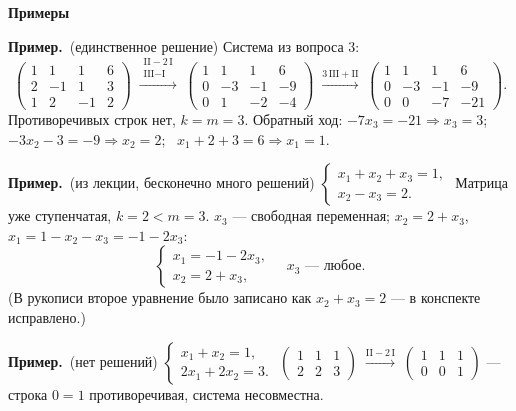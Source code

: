 \documentclass[a4paper,11pt]{article}
\newcommand{\gauss}[1]{\;\xrightarrow{\scriptstyle #1}\;}
\newcommand{\prim}{\par\smallskip\noindent\textbf{\textcolor{teoc!80!black}{Пример.}}\ }
\newcommand{\podr}[1]{\par\needspace{8\baselineskip}\medskip
  {\large\bfseries\textcolor{oprc!80!black}{#1}}\par\nopagebreak\smallskip}
\begin{document}
\podr{Примеры}

\prim (единственное решение) Система из вопроса 3:
\[
  \left(\begin{array}{rrr|r} 1 & 1 & 1 & 6 \\ 2 & -1 & 1 & 3 \\ 1 & 2 & -1 & 2 \end{array}\right)
  \gauss{\substack{\text{II} - 2\,\text{I} \\ \text{III} - \text{I}}}
  \left(\begin{array}{rrr|r} 1 & 1 & 1 & 6 \\ 0 & -3 & -1 & -9 \\ 0 & 1 & -2 & -4 \end{array}\right)
  \gauss{3\,\text{III} + \text{II}}
  \left(\begin{array}{rrr|r} 1 & 1 & 1 & 6 \\ 0 & -3 & -1 & -9 \\ 0 & 0 & -7 & -21 \end{array}\right).
\]
Противоречивых строк нет, $k = m = 3$. Обратный ход:
$-7x_3 = -21 \Rightarrow x_3 = 3$; \ $-3x_2 - 3 = -9 \Rightarrow x_2 = 2$; \ $x_1 + 2 + 3 = 6 \Rightarrow x_1 = 1$.

\prim (из лекции, бесконечно много решений) $\begin{cases} x_1 + x_2 + x_3 = 1, \\ x_2 - x_3 = 2. \end{cases}$
Матрица уже ступенчатая, $k = 2 < m = 3$. $x_3$ --- свободная переменная; $x_2 = 2 + x_3$, \ $x_1 = 1 - x_2 - x_3 = -1 - 2x_3$:
\[
  \begin{cases} x_1 = -1 - 2x_3, \\ x_2 = 2 + x_3, \end{cases} \quad x_3 \text{ --- любое}.
\]
{\small\textcolor{zamc}{(В рукописи второе уравнение было записано как $x_2 + x_3 = 2$ --- в конспекте исправлено.)}}

\prim (нет решений) $\begin{cases} x_1 + x_2 = 1, \\ 2x_1 + 2x_2 = 3. \end{cases}$ \quad
$\left(\begin{array}{rr|r} 1 & 1 & 1 \\ 2 & 2 & 3 \end{array}\right) \gauss{\text{II} - 2\,\text{I}}
\left(\begin{array}{rr|r} 1 & 1 & 1 \\ 0 & 0 & 1 \end{array}\right)$ --- строка $0 = 1$ противоречивая, система несовместна.
\end{document}

